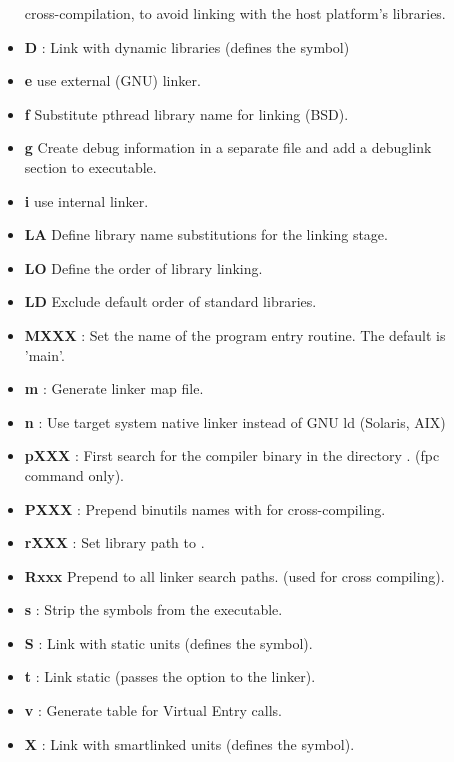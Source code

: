 \begin{description}
\begin{itemize}
cross-compilation, to avoid linking with the host platform's libraries.
\item \textbf{D} : Link with dynamic libraries (defines the
 symbol) 
\item \textbf{e} use external (GNU) linker.
\item \textbf{f}  Substitute pthread library name for linking (BSD).
\item \textbf{g} Create debug information in a separate file and add a debuglink section to executable.
\item \textbf{i} use internal linker.
\item \textbf{LA}  Define library name substitutions for the linking stage.
\item \textbf{LO}  Define the order of library linking.
\item \textbf{LD}  Exclude default order of standard libraries.
 \item \textbf{MXXX} : Set the name of the program entry routine.
The default is 'main'.
\item \textbf{m} : Generate linker map file.
\item \textbf{n} : Use target system native linker instead of GNU ld (Solaris, AIX)
\item \textbf{pXXX} :   First search for the compiler binary in the directory .  (fpc command only).
\item \textbf{PXXX} : Prepend binutils names with   for cross-compiling.
\item \textbf{rXXX} : Set library path to .
\item \textbf{Rxxx} Prepend  to all linker search paths. (used for
cross compiling).
\item \textbf{s} : Strip the symbols from the executable. 
\item \textbf{S} : Link with static units (defines the  symbol).
\item \textbf{t} : Link static (passes the  option to the linker). 
\item \textbf{v} : Generate table for Virtual Entry calls.
\item \textbf{X} : Link with smartlinked units (defines the  symbol). 
\end{itemize}
\end{description}

%
%

